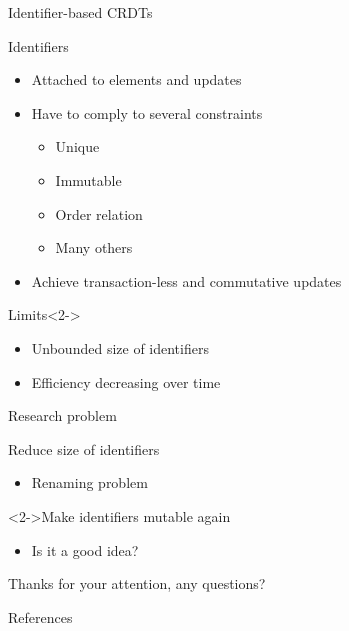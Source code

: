 \documentclass[10pt]{beamer}
\begin{document}
\begin{frame}{Identifier-based \acp{CRDT}}
  \begin{block}{Identifiers}
    \begin{itemize}
      \item Attached to elements and updates
      \item Have to comply to several constraints
      \begin{itemize}
        \item Unique
        \item Immutable
        \item Order relation
        \item Many others
      \end{itemize}
      \item Achieve transaction-less and commutative updates
    \end{itemize}
  \end{block}
  \begin{alertblock}{Limits}<2->
    \begin{itemize}
      \item Unbounded size of identifiers
      \item Efficiency decreasing over time
    \end{itemize}
  \end{alertblock}
\end{frame}

\begin{frame}{Research problem}
  \begin{block}{Reduce size of identifiers}
    \begin{itemize}
      \item Renaming problem
    \end{itemize}
  \end{block}
  \begin{alertblock}<2->{Make identifiers mutable again}
    \begin{itemize}
      \item Is it a good idea?
    \end{itemize}
  \end{alertblock}
\end{frame}

\begin{frame}[standout]
  Thanks for your attention, any questions?
  \vspace{3em}
  \begin{center}
    \ccby
  \end{center}
\end{frame}


\begin{frame}[allowframebreaks]{References}
	
	
\end{frame}
\end{document}
